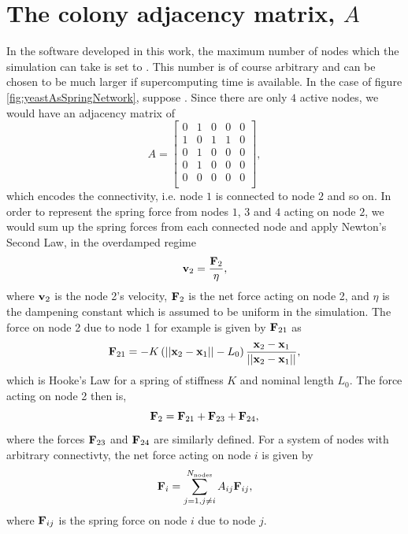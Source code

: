\section{The colony adjacency matrix, $A$}
In the software  developed in this work, the maximum 
number of nodes which the simulation can take is set to 
. This number is of course arbitrary and 
can be chosen to be much larger if supercomputing time is available. 
In the case of figure \ref{fig:yeastAsSpringNetwork}, suppose
. Since there are only $4$ active nodes,
we would have an adjacency matrix of 
\begin{equation*}
    A = 
    \begin{bmatrix}
    0 & 1 & 0 & 0 & 0  \\
    1 & 0 & 1 & 1 & 0  \\
    0 & 1 & 0 & 0 & 0  \\
    0 & 1 & 0 & 0 & 0  \\
    0 & 0 & 0 & 0 & 0  \\ 
    \end{bmatrix},
\end{equation*}
which encodes the connectivity, i.e. node $1$ is connected to node $2$ and so on.
In order to represent the spring force from nodes $1$, $3$ and $4$ acting on node $2$,
we would sum up the spring forces from each connected node and apply Newton's Second Law, 
in the overdamped regime
\begin{equation*}
    \vb{v}_2 = \frac{\vb{F}_2}{\eta},
\end{equation*}
where $\vb{v}_2$ is the node 2's velocity, $\vb{F}_2$ is the net force acting on 
node 2, and $\eta$ is the dampening constant which is assumed to be uniform in the simulation.
The force on node 2 due to node 1 for example is given by $\vb{F}_{21}$ as 
\begin{equation*}
    \vb{F}_{21} = -K \left( ||\vb{x}_2 - \vb{x}_1|| - L_0 \right) \frac{\vb{x}_2 - \vb{x}_1}{||\vb{x}_2 - \vb{x}_1||},
\end{equation*}
which is Hooke's Law for a spring of stiffness $K$ and nominal length $L_0$.
The force acting on node 2 then is,
\begin{equation*}
    \vb{F}_{2} = \vb{F}_{21} + \vb{F}_{23} + \vb{F}_{24},
\end{equation*}
where the forces $\vb{F}_{23}$ and $\vb{F}_{24}$ are similarly defined. For a
system of nodes with arbitrary connectivty, the net force 
acting on node $i$ is given by 
\begin{equation*}
    \vb{F}_{i} = \sum_{j = 1, j \neq i}^{N_{\textrm{nodes}}} A_{ij} \vb{F}_{ij},
\end{equation*}
where $\vb{F}_{ij}$ is the spring force on node $i$ due to node $j$.
\\

